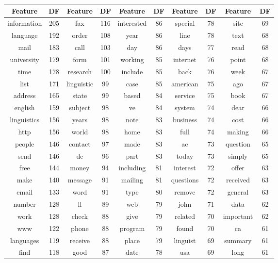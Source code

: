 \documentclass[10pt, a4paper]{article}
\begin{document}
\begin{tabular}{|c|c||c|c||c|c||c|c||c|c|}\centering

Feature & DF & Feature & DF & Feature & DF & Feature & DF & Feature & DF \\
\hline
information & 205 & fax & 116 & interested & 86 & special & 78 & site & 69 \\
language & 192 & order & 108 & year & 86 & line & 78 & text & 68 \\
mail & 183 & call & 103 & day & 86 & days & 77 & read & 68 \\
university & 179 & form & 101 & working & 85 & internet & 76 & point & 68 \\
time & 178 & research & 100 & include & 85 & back & 76 & week & 67 \\
list & 171 & linguistic & 99 & case & 85 & american & 75 & ago & 67 \\
address & 165 & state & 99 & based & 84 & service & 75 & book & 67 \\
english & 159 & subject & 98 & ve & 84 & system & 74 & dear & 66 \\
linguistics & 156 & years & 98 & note & 83 & business & 74 & cost & 66 \\
http & 156 & world & 98 & home & 83 & full & 74 & making & 66 \\
people & 146 & contact & 97 & made & 83 & ac & 73 & question & 65 \\
send & 146 & de & 96 & part & 83 & today & 73 & simply & 65 \\
free & 144 & money & 94 & including & 81 & interest & 72 & offer & 63 \\
make & 140 & message & 91 & mailing & 81 & questions & 72 & received & 63 \\
email & 133 & word & 91 & type & 80 & remove & 72 & general & 63 \\
number & 128 & ll & 89 & web & 79 & john & 71 & data & 62 \\
work & 128 & check & 88 & give & 79 & related & 70 & important & 62 \\
www & 122 & phone & 88 & program & 79 & found & 70 & ca & 61 \\
languages & 119 & receive & 88 & place & 79 & linguist & 69 & summary & 61 \\
find & 118 & good & 87 & date & 78 & usa & 69 & long & 61 \\
\hline

\end{tabular}


\end{document}

